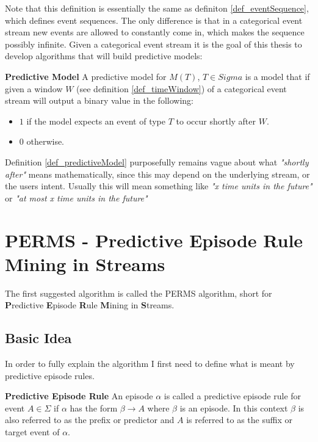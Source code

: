 Note that this definition is essentially the same as definiton \ref{def_eventSequence}, which defines event sequences. The only difference is that in a categorical event stream new events are allowed to constantly come in, which makes the sequence possibly infinite. Given a categorical event stream it is the goal of this thesis to develop algorithms that will build predictive models:

\begin{mydef}
\label{def_predictiveModel}
\textbf{Predictive Model} A predictive model for $M(T)$, $T \in Sigma$ is a model that if given a window $W$ (see definition \ref{def_timeWindow}) of a categorical event stream will output a binary value in the following:
\begin{itemize}
	\item $1$ if the model expects an event of type $T$ to occur shortly after $W$.
	\item 0 otherwise.
\end{itemize} 
\end{mydef}

Definition \ref{def_predictiveModel} purposefully remains vague about what \textit{"shortly after"} means mathematically, since this may depend on the underlying stream, or the users intent. Usually this will mean something like \textit{"x time units in the future"} or \textit{"at most x time units in the future"}

\section{PERMS - Predictive Episode Rule Mining in Streams}
\label{sec_predictiveEpisodeMining}
The first suggested algorithm is called the PERMS algorithm, short for \textbf{P}redictive \textbf{E}pisode \textbf{R}ule \textbf{M}ining in \textbf{S}treams.

\subsection{Basic Idea}
In order to fully explain the algorithm I first need to define what is meant by predictive episode rules.

\begin{mydef}
\label{def_predictiveEpisode}
\textbf{Predictive Episode Rule} An episode $\alpha$ is called a predictive episode rule for event $A \in \Sigma$ if $\alpha$ has the form $\beta \rightarrow A$ where $\beta$ is an episode. In this context $\beta$ is also referred to as the prefix or predictor and $A$ is referred to as the suffix or target event of $\alpha$. 
\end{mydef}

